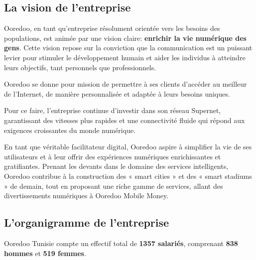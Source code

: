 \subsection{La vision de l’entreprise}

 Ooredoo, en tant qu'entreprise résolument orientée vers les besoins des populations, est animée par une vision claire: \textbf{enrichir la vie numérique des gens}. Cette vision repose sur la conviction que la communication est un puissant levier pour stimuler le développement humain et aider les individus à atteindre leurs objectifs, tant personnels que professionnels. 

Ooredoo se donne pour mission de permettre à ses clients d'accéder au meilleur de l'Internet, de manière personnalisée et adaptée à leurs besoins uniques. 

Pour ce faire, l'entreprise continue d'investir dans son réseau Supernet, garantissant des vitesses plus rapides et une connectivité fluide qui répond aux exigences croissantes du monde numérique. 

En tant que véritable facilitateur digital, Ooredoo aspire à simplifier la vie de ses utilisateurs et à leur offrir des expériences numériques enrichissantes et gratifiantes. Prenant les devants dans le domaine des services intelligents, Ooredoo contribue à la construction des « smart cities » et des « smart stadiums » de demain, tout en proposant une riche gamme de services, allant des divertissements numériques à Ooredoo Mobile Money.


\subsection{L’organigramme de l’entreprise} 

 Ooredoo Tunisie compte un effectif total de \textbf{1357 salariés}, comprenant \textbf{838 hommes} et \textbf{519 femmes}.

